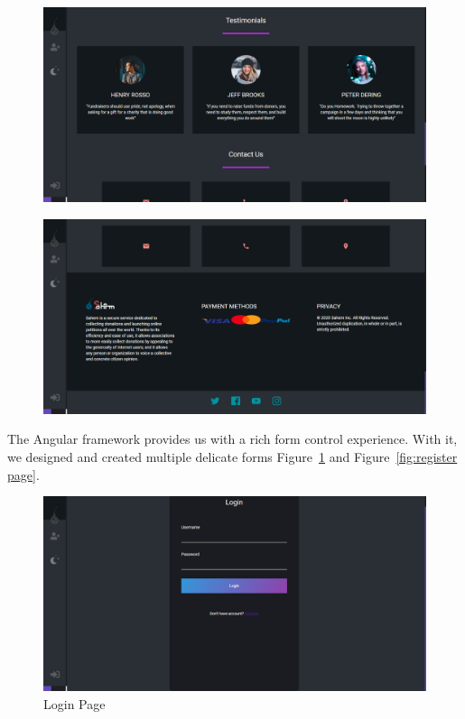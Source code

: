  \begin{figure}[H]
      \centering
      \includegraphics[scale=0.45]{assets/screen-main-test.png}
\end{figure}
\begin{figure}[H]
      \centering
      \includegraphics[scale=0.45]{assets/screen-main-foot.png}
\end{figure}






The Angular framework provides us with a rich form control experience. With it, we designed and created multiple delicate forms Figure~\ref{fig:login page} and Figure~\ref{fig:register page}. 
\begin{figure}[H]
      \centering
      \includegraphics[scale=0.45]{assets/screen-login.png}
      \caption{Login Page}
      \label{fig:login page}
\end{figure}

